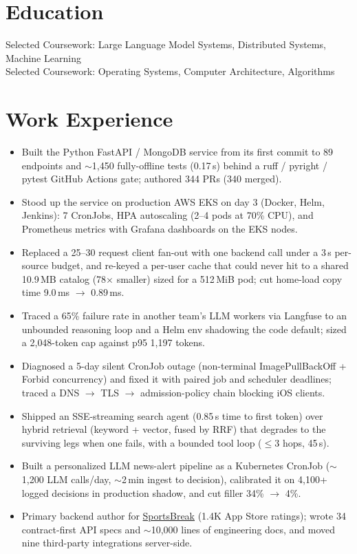 \documentclass[11pt, letterpaper]{article}
\begin{document}

\section{Education}
Selected Coursework: Large Language Model Systems, Distributed Systems, Machine Learning\\[1pt]
Selected Coursework: Operating Systems, Computer Architecture, Algorithms

\section{Work Experience}
\begin{itemize}
  \item Built the Python FastAPI / MongoDB service from its first commit to 89 endpoints and $\sim$1{,}450 fully-offline tests (0.17\,s) behind a ruff / pyright / pytest GitHub Actions gate; authored 344 PRs (340 merged).
  \item Stood up the service on production AWS EKS on day 3 (Docker, Helm, Jenkins): 7 CronJobs, HPA autoscaling (2--4 pods at 70\% CPU), and Prometheus metrics with Grafana dashboards on the EKS nodes.
  \item Replaced a 25--30 request client fan-out with one backend call under a 3\,s per-source budget, and re-keyed a per-user cache that could never hit to a shared 10.9\,MB catalog (78$\times$ smaller) sized for a 512\,MiB pod; cut home-load copy time 9.0\,ms $\to$ 0.89\,ms.
  \item Traced a 65\% failure rate in another team's LLM workers via Langfuse to an unbounded reasoning loop and a Helm env shadowing the code default; sized a 2{,}048-token cap against p95 1{,}197 tokens.
  \item Diagnosed a 5-day silent CronJob outage (non-terminal ImagePullBackOff + Forbid concurrency) and fixed it with paired job and scheduler deadlines; traced a DNS $\to$ TLS $\to$ admission-policy chain blocking iOS clients.
  \item Shipped an SSE-streaming search agent (0.85\,s time to first token) over hybrid retrieval (keyword + vector, fused by RRF) that degrades to the surviving legs when one fails, with a bounded tool loop ($\le$3 hops, 45\,s).
  \item Built a personalized LLM news-alert pipeline as a Kubernetes CronJob ($\sim$1{,}200 LLM calls/day, $\sim$2\,min ingest to decision), calibrated it on 4{,}100+ logged decisions in production shadow, and cut filler 34\% $\to$ 4\%.
  \item Primary backend author for \href{https://apps.apple.com/app/id6762649287}{SportsBreak} (1.4K App Store ratings); wrote 34 contract-first API specs and $\sim$10{,}000 lines of engineering docs, and moved nine third-party integrations server-side.
\end{itemize}
\end{document}
